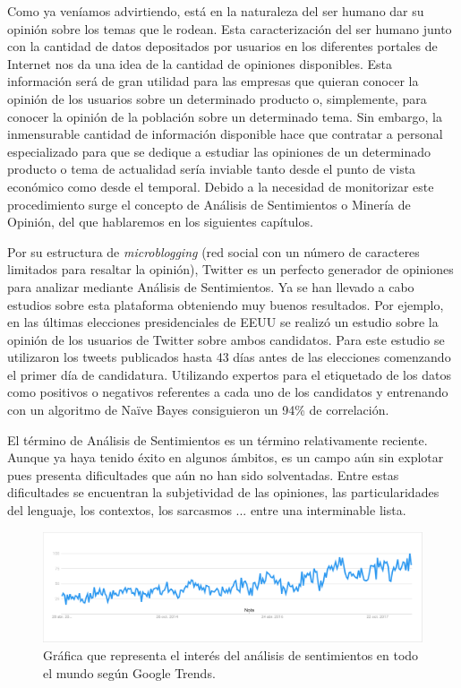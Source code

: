 	 Como ya veníamos advirtiendo, está en la naturaleza del ser humano dar su opinión sobre los temas que le rodean. Esta caracterización del ser humano junto con la cantidad de datos depositados por usuarios en los diferentes portales de Internet nos da una idea de la cantidad de opiniones disponibles. Esta información será de gran utilidad para las empresas que quieran conocer la opinión de los usuarios sobre un determinado producto o, simplemente, para conocer la opinión de la población sobre un determinado tema.  Sin embargo, la inmensurable cantidad de información disponible hace que contratar a personal especializado para que se dedique a estudiar las opiniones de un determinado producto o tema de actualidad sería inviable tanto desde el punto de vista económico como desde el temporal.  Debido a la necesidad de monitorizar este procedimiento surge el concepto de Análisis de Sentimientos o Minería de Opinión, del que hablaremos en los siguientes capítulos.
	 
	 Por su estructura de \textit{microblogging} (red social con un número de caracteres limitados para resaltar la opinión), Twitter es un perfecto generador de opiniones para analizar mediante Análisis de Sentimientos. Ya se han llevado a cabo estudios sobre esta plataforma obteniendo muy buenos resultados. Por ejemplo, en las últimas elecciones presidenciales de EEUU se realizó un estudio sobre la opinión de los usuarios de Twitter sobre ambos candidatos. Para este estudio se utilizaron los tweets publicados hasta 43 días antes de las elecciones comenzando el primer día de candidatura. Utilizando expertos para el etiquetado de los datos como positivos o negativos referentes a cada uno de los candidatos y entrenando con un algoritmo de Naïve Bayes consiguieron un 94\% de correlación.
	 
	 El término de Análisis de Sentimientos es un término relativamente reciente. Aunque ya haya tenido éxito en algunos ámbitos, es un campo aún sin explotar pues presenta dificultades que aún no han sido solventadas.  Entre estas dificultades se encuentran la subjetividad de las opiniones, las particularidades del lenguaje, los contextos, los sarcasmos ... entre una interminable lista.
	 
	 
	 \begin{figure}[h!]
	 	\centering
	 	\includegraphics[width=1\linewidth]{imagenes/interes}
	 	\caption{Gráfica que representa el interés del análisis de sentimientos en todo el mundo según Google Trends.}
	 	\label{fig:interes}
	 \end{figure}
	 
